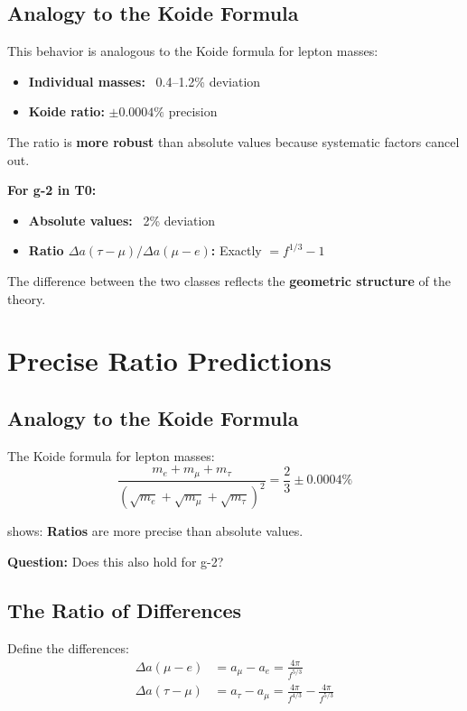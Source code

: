 	\subsection{Analogy to the Koide Formula}
	
	This behavior is analogous to the Koide formula for lepton masses:
	
	\begin{itemize}
		\item \textbf{Individual masses:} ~0.4--1.2\% deviation
		\item \textbf{Koide ratio:} $\pm 0.0004\%$ precision
	\end{itemize}
	
	The ratio is \textbf{more robust} than absolute values because systematic factors cancel out.
	
	\textbf{For g-2 in T0:}
	\begin{itemize}
		\item \textbf{Absolute values:} ~2\% deviation
		\item \textbf{Ratio $\Delta a(\tau-\mu)/\Delta a(\mu-e)$:} Exactly $= f^{1/3} - 1$
	\end{itemize}
	
	The difference between the two classes reflects the \textbf{geometric structure} of the theory.
	
	\section{Precise Ratio Predictions}
	
	\subsection{Analogy to the Koide Formula}
	
	The Koide formula for lepton masses:
	\begin{equation}
		\frac{m_e + m_\mu + m_\tau}{(\sqrt{m_e} + \sqrt{m_\mu} + \sqrt{m_\tau})^2} = \frac{2}{3} \pm 0.0004\%
	\end{equation}
	
	shows: \textbf{Ratios} are more precise than absolute values.
	
	\textbf{Question:} Does this also hold for g-2?
	
	\subsection{The Ratio of Differences}
	
	Define the differences:
	\begin{align}
		\Delta a(\mu - e) &= a_\mu - a_e = \frac{4\pi}{f^{5/3}} \\
		\Delta a(\tau - \mu) &= a_\tau - a_\mu = \frac{4\pi}{f^{4/3}} - \frac{4\pi}{f^{5/3}}
	\end{align}
	
